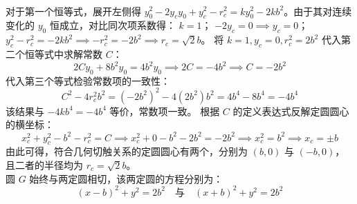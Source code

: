 \begin{solution}
\begin{align*}
\end{align*}
对于第一个恒等式，展开左侧得 $y_0^2 - 2y_c y_0 + y_c^2 - r_c^2 = k y_0^2 - 2k b^2$。由于其对连续变化的 $y_0$ 恒成立，对比同次项系数得：
$k = 1$；
$-2y_c = 0 \implies y_c = 0$；
$y_c^2 - r_c^2 = -2k b^2 \implies -r_c^2 = -2b^2 \implies r_c = \sqrt{2}b$。
将 $k = 1, y_c = 0, r_c^2 = 2b^2$ 代入第二个恒等式中求解常数 $C$：
$$ 2C y_0 + 8b^2 y_0 = 4b^2 y_0 \implies 2C = -4b^2 \implies C = -2b^2 $$
代入第三个等式检验常数项的一致性：
$$ C^2 - 4r_c^2 b^2 = (-2b^2)^2 - 4(2b^2)b^2 = 4b^4 - 8b^4 = -4b^4 $$
该结果与 $-4k b^4 = -4b^4$ 等价，常数项一致。
根据 $C$ 的定义表达式反解定圆圆心的横坐标：
$$ x_c^2 + y_c^2 - b^2 - r_c^2 = C \implies x_c^2 + 0 - b^2 - 2b^2 = -2b^2 \implies x_c^2 = b^2 \implies x_c = \pm b $$
由此可得，符合几何切触关系的定圆圆心有两个，分别为 $(b, 0)$ 与 $(-b, 0)$，且二者的半径均为 $r_c = \sqrt{2}b$。\\
圆 $G$ 始终与两定圆相切，该两定圆的方程分别为：
$$ (x - b)^2 + y^2 = 2b^2 \quad \text{与} \quad (x + b)^2 + y^2 = 2b^2 $$

\end{solution}






